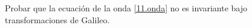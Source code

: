 \begin{ej}
	Probar que la ecuación de la onda \eqref{11.onda} no es invariante bajo transformaciones de Galileo.
\end{ej}
























































